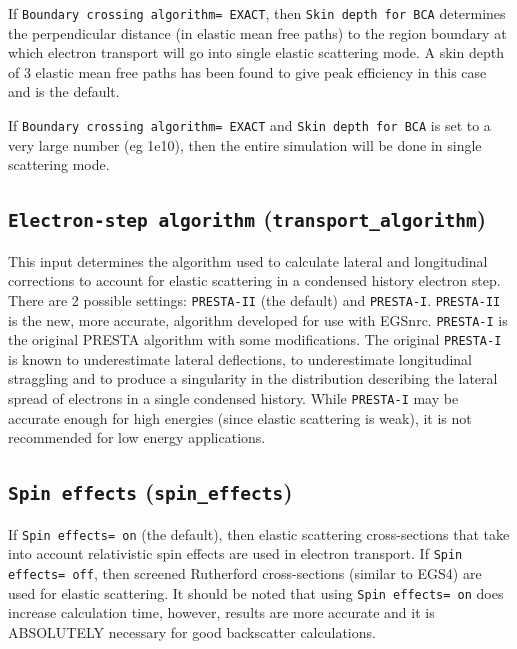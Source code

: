 \documentclass[12pt,twoside]{article}
\begin{document}
If {\tt Boundary crossing algorithm= EXACT}, then {\tt  Skin depth for BCA}
determines the perpendicular distance (in elastic mean
free paths) to the region boundary
at which electron transport will go into
single elastic scattering mode.  A skin depth of 3 elastic mean free
paths has been found to give peak efficiency in this case and is the
default.

If {\tt Boundary crossing algorithm= EXACT} and
{\tt  Skin depth for BCA} is set to a very large number (eg 1e10),
then the entire simulation will be done in single scattering mode.

\subsection{{\tt Electron-step algorithm} ({\tt transport\_algorithm})}
\label{essect}

This input determines the algorithm used to calculate lateral and
longitudinal corrections to account for elastic scattering in a condensed
history electron step.  There are 2 possible settings: {\tt PRESTA-II}
(the default) and {\tt PRESTA-I}.  {\tt PRESTA-II}  is the new,
more accurate, algorithm developed for use with EGSnrc\cite{KR03}.
{\tt PRESTA-I} is the original PRESTA algorithm with some
modifications\cite{BR87}.  The original {\tt PRESTA-I} is known
to underestimate lateral deflections, to underestimate longitudinal
straggling and to produce a singularity in the distribution describing
the lateral spread of electrons in a single condensed history.  While
{\tt PRESTA-I} may be accurate enough for high energies (since elastic
scattering is weak), it is not recommended for low energy applications.

\subsection{{\tt Spin effects} ({\tt spin\_effects})}

If {\tt Spin effects= on} (the default), then elastic scattering
cross-sections that take into account relativistic spin effects are used
in electron transport.  If {\tt Spin effects= off},  then
screened Rutherford cross-sections (similar to EGS4) are used for elastic
scattering.  It should be noted that using {\tt Spin effects= on} does
increase calculation time, however, results are more accurate and it
is ABSOLUTELY necessary for good backscatter calculations.
\end{document}
